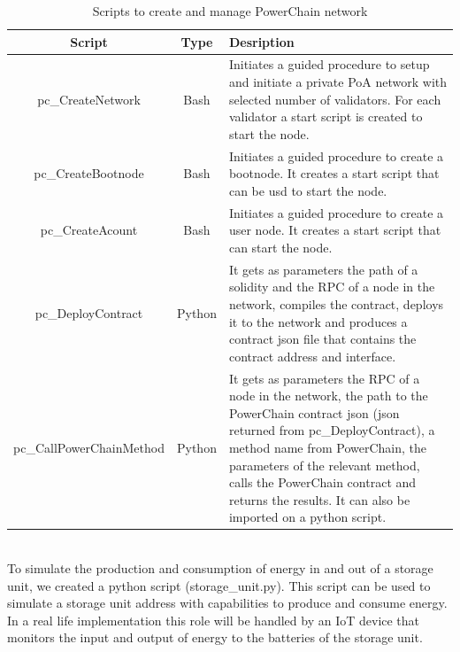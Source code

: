 \begin{table}[h!]
\centering
\begin{tabular}{c|c|p{8cm}}
    \textbf{Script} & \textbf{Type} & \textbf{Desription} \\
    \hline
    pc\_CreateNetwork & Bash & Initiates a guided procedure to setup and initiate a private PoA network with selected number of validators. For each validator a start script is created to start the node. \\
    \hline
    pc\_CreateBootnode & Bash & Initiates a guided procedure to create a bootnode. It creates a start script that can be usd to start the node. \\
    \hline
    pc\_CreateAcount & Bash & Initiates a guided procedure to create a user node. It creates a start script that can start the node. \\
    \hline
    pc\_DeployContract & Python & It gets as parameters the path of a solidity and the RPC of a node in the network, compiles the contract, deploys it to the network and produces a contract json file that contains the contract address and interface. \\
    \hline
    pc\_CallPowerChainMethod & Python & It gets as parameters the RPC of a node in the network, the path to the PowerChain contract json (json returned from pc\_DeployContract), a method name from PowerChain, the parameters of the relevant method, calls the PowerChain contract and returns the results. It can also be imported on a python script. \\ 
\end{tabular}
\caption{Scripts to create and manage PowerChain network}
\end{table}\\ 

To simulate the production and consumption of energy in and out of a storage unit, we created a python script (storage\_unit.py). 
This script can be used to simulate a storage unit address with capabilities to produce and consume energy. 
In a real life implementation this role will be handled by an IoT device that monitors the input and output of energy to the batteries of the storage unit.

